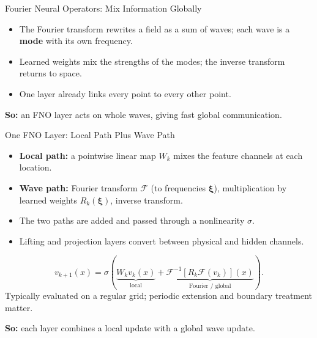 \documentclass{ntuabeamer}
\begin{document}
\begin{frame}{Fourier Neural Operators: Mix Information Globally}
  \centering

  \raggedright
  \vspace{0.3cm}
  \begin{itemize}
    \item The Fourier transform rewrites a field as a sum of waves; each wave is a \textbf{mode} with its own frequency.
    \item Learned weights mix the strengths of the modes; the inverse transform returns to space.
    \item One layer already links every point to every other point.
  \end{itemize}
  \textbf{So:} an FNO layer acts on whole waves, giving fast global communication.
\end{frame}

\begin{frame}{One FNO Layer: Local Path Plus Wave Path}
  \begin{itemize}
    \item \textbf{Local path:} a pointwise linear map \(W_k\) mixes the feature channels at each location.
    \item \textbf{Wave path:} Fourier transform \(\mathcal F\) (to frequencies \(\boldsymbol\xi\)), multiplication by learned weights \(R_k(\boldsymbol\xi)\), inverse transform.
    \item The two paths are added and passed through a nonlinearity \(\sigma\).
    \item Lifting and projection layers convert between physical and hidden channels.
  \end{itemize}
  \[
 v_{k+1}(x)=\sigma\!\left(\underbrace{W_kv_k(x)}_{\text{local}}+
 \underbrace{\mathcal F^{-1}[R_k\mathcal F(v_k)](x)}_{\text{Fourier / global}}\right).
\]
Typically evaluated on a regular grid; periodic extension and boundary treatment matter.

  \medskip
  \textbf{So:} each layer combines a local update with a global wave update.
\end{frame}
\end{document}
